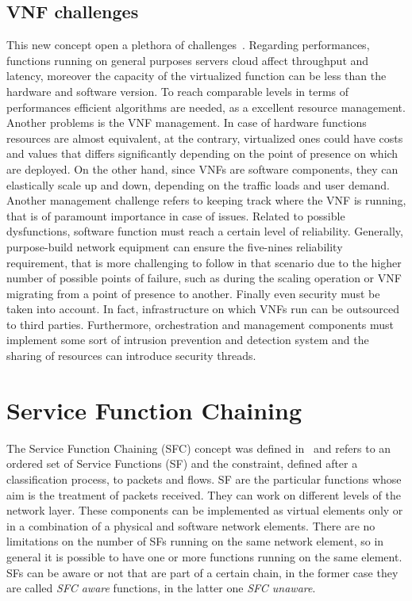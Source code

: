 \subsection{VNF challenges}
This new concept open a plethora of challenges~\cite{han2015network}. Regarding
performances, functions running on general purposes servers cloud affect
throughput and latency, moreover the capacity of the virtualized function can be
less than the hardware and software version. To reach comparable levels in terms
of performances efficient algorithms are needed, as a excellent resource
management. Another problems is the VNF management. In case of hardware
functions resources are almost equivalent, at the contrary, virtualized ones
could have costs and values that differs significantly depending on the point of
presence on which are deployed. On the other hand, since VNFs are software
components, they can elastically scale up and down, depending on the traffic
loads and user demand. Another management challenge refers to keeping track
where the VNF is running, that is of paramount importance in case of issues.
Related to possible dysfunctions, software function must reach a certain level
of reliability. Generally, purpose-build network equipment can ensure the
five-nines reliability requirement, that is more challenging to follow in that
scenario due to the higher number of possible points of failure, such as during
the scaling operation or VNF migrating from a point of presence to another.
Finally even security must be taken into account. In fact, infrastructure on
which VNFs run can be outsourced to third parties. Furthermore, orchestration
and management components must implement some sort of intrusion prevention and
detection system and the sharing of resources can introduce security threads.

\section{Service Function Chaining}
The Service Function Chaining (SFC) concept was defined
in~\cite{halpern2015service} and refers to an ordered set of Service Functions
(SF) and the constraint, defined after a classification process, to packets and
flows. SF are the particular functions whose aim is the treatment of packets
received. They can work on different levels of the network layer. These
components can be implemented as virtual elements only or in a combination of a
physical and software network elements. There are no limitations on the number
of SFs running on the same network element, so in general it is possible to have
one or more functions running on the same element. SFs can be aware or not that
are part of a certain chain, in the former case they are called \emph{SFC aware}
functions, in the latter one \emph{SFC unaware}.

